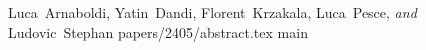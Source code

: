 \paperchapter%
  {}%
  {Luca~Arnaboldi, Yatin~Dandi, Florent~Krzakala, Luca~Pesce, \emph{and} Ludovic~Stephan}%
  {papers/2405/abstract.tex}
\label{chap:paper-2405}
{\let\appendix\endinput {main}}
